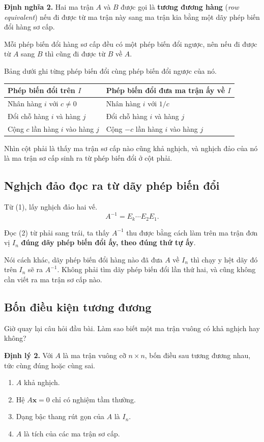\documentclass[12pt,a4paper]{article}
\begin{document}
\textbf{Định nghĩa 2.} Hai ma trận \(A\) và \(B\) được gọi là \textbf{tương đương hàng} (\emph{row equivalent}) nếu đi được từ ma trận này sang ma trận kia bằng một dãy phép biến đổi hàng sơ cấp.

Mỗi phép biến đổi hàng sơ cấp đều có một phép biến đổi ngược, nên nếu đi được từ \(A\) sang \(B\) thì cũng đi được từ \(B\) về \(A\).

Bảng dưới ghi từng phép biến đổi cùng phép biến đổi ngược của nó.
\begin{center}
\begin{tabular}{ll}
Phép biến đổi trên \(I\) & Phép biến đổi đưa ma trận ấy về \(I\)\\ \hline
Nhân hàng \(i\) với \(c\neq0\) & Nhân hàng \(i\) với \(1/c\)\\
Đổi chỗ hàng \(i\) và hàng \(j\) & Đổi chỗ hàng \(i\) và hàng \(j\)\\
Cộng \(c\) lần hàng \(i\) vào hàng \(j\) & Cộng \(-c\) lần hàng \(i\) vào hàng \(j\)
\end{tabular}
\end{center}

Nhìn cột phải là thấy ma trận sơ cấp nào cũng khả nghịch, và nghịch đảo của nó là ma trận sơ cấp sinh ra từ phép biến đổi ở cột phải.

\subsection{Nghịch đảo đọc ra từ dãy phép biến đổi}

Từ (1), lấy nghịch đảo hai vế.
$$
A^{-1}=E_k\cdots E_2E_1. \tag{2}
$$

Đọc (2) từ phải sang trái, ta thấy \(A^{-1}\) thu được bằng cách làm trên ma trận đơn vị \(I_n\) \textbf{đúng dãy phép biến đổi ấy, theo đúng thứ tự ấy}.

Nói cách khác, dãy phép biến đổi hàng nào đã đưa \(A\) về \(I_n\) thì chạy y hệt dãy đó trên \(I_n\) sẽ ra \(A^{-1}\). Không phải tìm dãy phép biến đổi lần thứ hai, và cũng không cần viết ra ma trận sơ cấp nào.

\subsection{Bốn điều kiện tương đương}

Giờ quay lại câu hỏi đầu bài. Làm sao biết một ma trận vuông có khả nghịch hay không?

\textbf{Định lý 2.} Với \(A\) là ma trận vuông cỡ \(n\times n\), bốn điều sau tương đương nhau, tức cùng đúng hoặc cùng sai.
\begin{enumerate}
  \item[(a)] \(A\) khả nghịch.
  \item[(b)] Hệ \(A\mathbf{x}=0\) chỉ có nghiệm tầm thường.
  \item[(c)] Dạng bậc thang rút gọn của \(A\) là \(I_n\).
  \item[(d)] \(A\) là tích của các ma trận sơ cấp.
\end{enumerate}
\end{document}
